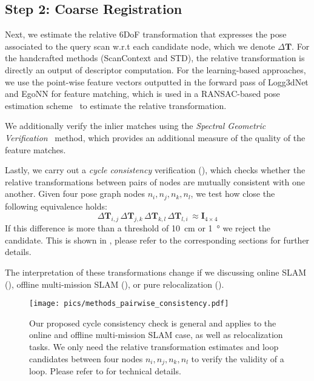 \subsection*{\textbf{Step 2: Coarse Registration}}
\label{subsubsec:coarse-registration}
Next, we estimate the relative 6DoF transformation that expresses the pose associated to the query scan w.r.t each candidate node, which we denote $\Delta \mathbf{T}$. For the handcrafted methods (ScanContext and STD), the relative transformation is directly an output of descriptor computation. For the learning-based approaches, we use the point-wise feature vectors outputted in the forward pass of Logg3dNet and EgoNN for feature matching, which is used in a RANSAC-based pose estimation scheme~\cite{fischler1981ransac} to estimate the relative transformation.


We additionally verify the inlier matches using the \emph{Spectral Geometric Verification}~\cite{vidanapathirana2023ral} method, which provides an additional measure of the quality of the feature matches.

Lastly, we carry out a \emph{cycle consistency} verification (), which checks whether the relative transformations between pairs of nodes are mutually consistent with one another. Given four pose graph nodes $n_i, n_j, n_k, n_l$, we test how close the following equivalence holds:
\begin{equation}
\Delta\mathbf{T}_{i,j}\, \Delta\mathbf{T}_{j,k}\, \Delta\mathbf{T}_{k,l}\, \Delta\mathbf{T}_{l,i}\, \approx \mathbf{I}_{4\times4} 
\end{equation}
If this difference is more than a threshold of \SI{10}{\centi\meter} or \SI{1}{\degree} we reject the candidate. This is shown in , please refer to the corresponding sections for further details.

The interpretation of these transformations change if we discussing online SLAM (), offline multi-mission SLAM (), or pure relocalization (). 

\begin{figure}[t]
  \centering
  \texttt{[image: pics/methods\_pairwise\_consistency.pdf]}
  \caption{Our proposed cycle consistency check is general and applies to the online and offline multi-mission SLAM case, as well as relocalization tasks. We only need the relative transformation estimates and loop candidates between four nodes $n_i, n_j, n_k, n_l$ to verify the validity of a loop. Please refer to  for technical details.}
  \label{fig:cycle-consistency}
\end{figure}

